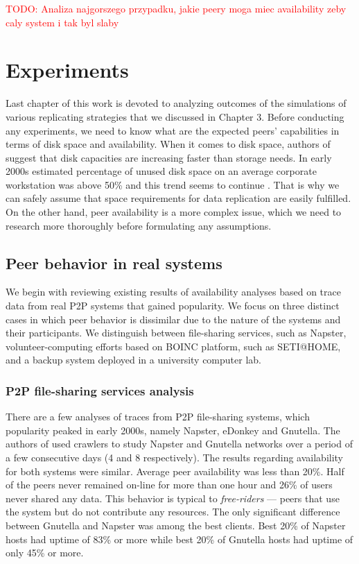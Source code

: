 \documentclass{pracamgren}
\begin{document}
\textcolor{red}{TODO: Analiza najgorszego przypadku, jakie peery moga miec availability zeby caly system i tak byl slaby}

%
%
%
%

\chapter{Experiments}\label{chap:experiments}

Last chapter of this work is devoted to analyzing outcomes of the simulations of various replicating strategies that we discussed in Chapter 3.
Before conducting any experiments, we need to know what are the expected peers' capabilities in terms of disk space and availability. When it comes to disk space, authors of \cite{farsite} suggest that disk capacities are increasing faster than storage needs. In early 2000s estimated percentage of unused disk space on an average corporate workstation was above 50\% \cite{farsite} and this trend seems to continue \cite{hetero}. That is why we can safely assume that space requirements for data replication are easily fulfilled. On the other hand, peer availability is a more complex issue, which we need to research more thoroughly before formulating any assumptions. \\

\section{Peer behavior in real systems}

We begin with reviewing existing results of availability analyses based on trace data from real P2P systems that gained popularity. We focus on three distinct cases in which peer behavior is dissimilar due to the nature of the systems and their participants. We distinguish between file-sharing services, such as Napster, volunteer-computing efforts based on BOINC platform, such as SETI@HOME, and a backup system deployed in a university computer lab.\\

\subsection{P2P file-sharing services analysis}

There are a few analyses of traces from P2P file-sharing systems, which popularity peaked in early 2000s, namely Napster, eDonkey and Gnutella. The authors of \cite{napster} used crawlers to study Napster and Gnutella networks over a period of a few consecutive days (4 and 8 respectively). The results regarding availability for both systems were similar. Average peer availability was less than 20\%. Half of the peers never remained on-line for more than one hour and 26\% of users never shared any data. This behavior is typical to {\it free-riders} --- peers that use the system but do not contribute any resources. The only significant difference between Gnutella and Napster was among the best clients. Best 20\% of Napster hosts had uptime of 83\% or more while best 20\% of Gnutella hosts had uptime of only 45\% or more.\\
\end{document}
